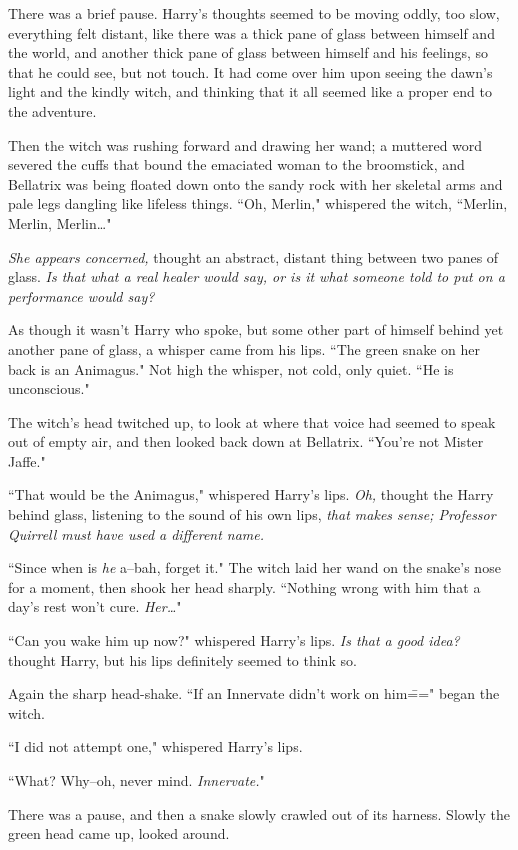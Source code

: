 There was a brief pause. Harry's thoughts seemed to be moving oddly, too slow, everything felt distant, like there was a thick pane of glass between himself and the world, and another thick pane of glass between himself and his feelings, so that he could see, but not touch. It had come over him upon seeing the dawn's light and the kindly witch, and thinking that it all seemed like a proper end to the adventure.

Then the witch was rushing forward and drawing her wand; a muttered word severed the cuffs that bound the emaciated woman to the broomstick, and Bellatrix was being floated down onto the sandy rock with her skeletal arms and pale legs dangling like lifeless things. ``Oh, Merlin," whispered the witch, ``Merlin, Merlin, Merlin{\ldots}"

\emph{She appears concerned,} thought an abstract, distant thing between two panes of glass. \emph{Is that what a real healer would say, or is it what someone told to put on a performance would say?}

As though it wasn't Harry who spoke, but some other part of himself behind yet another pane of glass, a whisper came from his lips. ``The green snake on her back is an Animagus." Not high the whisper, not cold, only quiet. ``He is unconscious."

The witch's head twitched up, to look at where that voice had seemed to speak out of empty air, and then looked back down at Bellatrix. ``You're not Mister Jaffe."

``That would be the Animagus," whispered Harry's lips. \emph{Oh,} thought the Harry behind glass, listening to the sound of his own lips, \emph{that makes sense; Professor Quirrell must have used a different name.}

``Since when is \emph{he} a\---bah, forget it." The witch laid her wand on the snake's nose for a moment, then shook her head sharply. ``Nothing wrong with him that a day's rest won't cure. \emph{Her{\ldots}}"

``Can you wake him up now?" whispered Harry's lips. \emph{Is that a good idea?} thought Harry, but his lips definitely seemed to think so.

Again the sharp head-shake. ``If an Innervate didn't work on him\===" began the witch.

``I did not attempt one," whispered Harry's lips.

``What? Why\---oh, never mind. \emph{Innervate.}"

There was a pause, and then a snake slowly crawled out of its harness. Slowly the green head came up, looked around.

